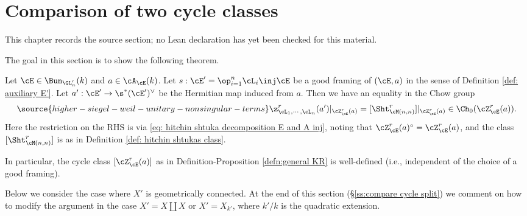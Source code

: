 \chapter{Comparison of two cycle classes}
\label{higher-siegel-weil-unitary-nonsingular-terms-chapter-10}

\begin{remark}
\label{higher-siegel-weil-unitary-nonsingular-terms-chapter-10-source}
This chapter records the source section; no Lean declaration has yet been checked for this material.
\notready
\end{remark}

\label{s:compare cycles}
The goal in this section is to show the following theorem.

\begin{thm}
\notready\label{th:compare KR} Let $\cE\in \Bun_{\GL_{n}'}(k)$ and $a\in \cA_{\cE}(k)$. Let $s:\cE'=\op_{i=1}^{n}\cL_{i}\inj \cE$ be a good framing of $(\cE,a)$ in the sense of Definition \ref{def: auxiliary E'}. Let $a':\cE'\to\s^{*}(\cE')^{\vee}$ be the Hermitian map induced from $a$. Then we have an equality in the Chow group
\begin{equation}\label{KR vs ShtM}
\source{higher-siegel-weil-unitary-nonsingular-terms}
\z^{r}_{\cL_{1},\cdots, \cL_{n}}(a')|_{\cZ^{r}_{\cE}(a)}=[\Sht^{r}_{\cM(n,n)}]|_{\cZ^{r}_{\cE}(a)}\in \Ch_{0}(\cZ^{r}_{\cE}(a)).
\end{equation}
Here the restriction on the RHS is via \eqref{eq: hitchin shtuka decomposition E and A inj}, noting that $\cZ_{\cE}^r(a)^{\circ}=\cZ_{\cE}^r(a)$, and the class $[\Sht^{r}_{\cM(n,n)}]$ is as in Definition \ref{def: hitchin shtukas class}.%

In particular, the cycle class $[\cZ^{r}_{\cE}(a)]$ as in Definition-Proposition \ref{defn:general KR} is well-defined (i.e., independent of the choice of a good framing).
\end{thm}

Below we consider the case where $X'$ is geometrically connected. At the end of this section (\S\ref{ss:compare cycle split}) we comment on how to modify the argument in the case $X'=X\coprod X$ or $X'=X_{k'}$, where $k'/k$ is the quadratic extension.

